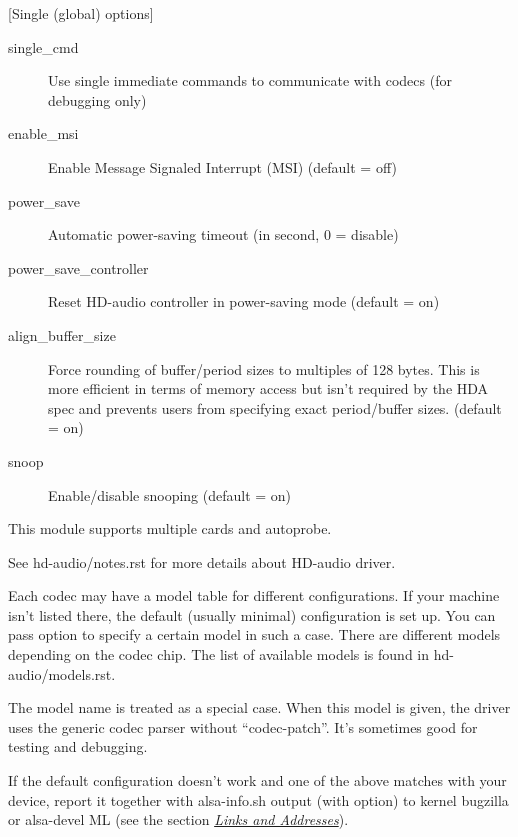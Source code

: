 \documentclass[a4paper,8pt,english]{sphinxmanual}
\begin{document}
{[}Single (global) options{]}
\begin{description}
\item[{single\_cmd}] \leavevmode
Use single immediate commands to communicate with codecs
(for debugging only)

\item[{enable\_msi}] \leavevmode
Enable Message Signaled Interrupt (MSI) (default = off)

\item[{power\_save}] \leavevmode
Automatic power-saving timeout (in second, 0 = disable)

\item[{power\_save\_controller}] \leavevmode
Reset HD-audio controller in power-saving mode (default = on)

\item[{align\_buffer\_size}] \leavevmode
Force rounding of buffer/period sizes to multiples of 128 bytes.
This is more efficient in terms of memory access but isn't
required by the HDA spec and prevents users from specifying
exact period/buffer sizes. (default = on)

\item[{snoop}] \leavevmode
Enable/disable snooping (default = on)

\end{description}

This module supports multiple cards and autoprobe.

See hd-audio/notes.rst for more details about HD-audio driver.

Each codec may have a model table for different configurations.
If your machine isn't listed there, the default (usually minimal)
configuration is set up.  You can pass  option to
specify a certain model in such a case.  There are different
models depending on the codec chip.  The list of available models
is found in hd-audio/models.rst.

The model name  is treated as a special case.  When this
model is given, the driver uses the generic codec parser without
``codec-patch''.  It's sometimes good for testing and debugging.

If the default configuration doesn't work and one of the above
matches with your device, report it together with alsa-info.sh
output (with  option) to kernel bugzilla or alsa-devel
ML (see the section {\hyperref[sound/alsa\string-configuration:links\string-and\string-addresses]{\emph{Links and Addresses}}}).
\end{document}

